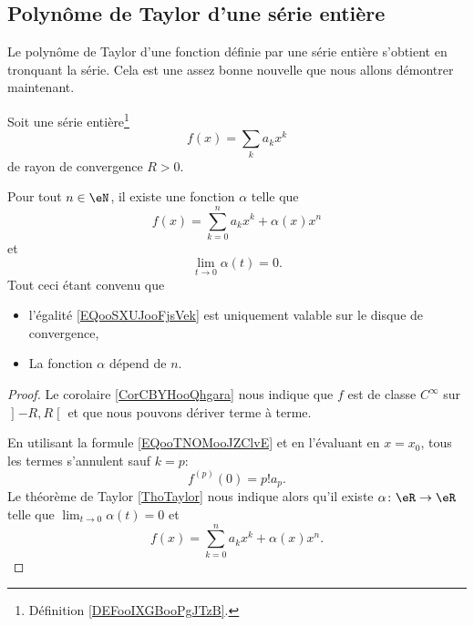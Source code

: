 \subsection{Polynôme de Taylor d'une série entière}

Le polynôme de Taylor d'une fonction définie par une série entière s'obtient en tronquant la série. Cela est une assez bonne nouvelle que nous allons démontrer maintenant.

\begin{proposition}      \label{PROPooQLHNooRsBYbe}
	Soit une série entière\footnote{Définition \ref{DEFooIXGBooPgJTzB}.}
	\begin{equation}
		f(x)=\sum_ka_kx^k
	\end{equation}
	de rayon de convergence \( R>0\).

	Pour tout \( n\in \eN\), il existe une fonction \( \alpha\) telle que
	\begin{equation}    \label{EQooSXUJooFjsVek}
		f(x)=\sum_{k=0}^na_kx^k+\alpha(x)x^n
	\end{equation}
	et
	\begin{equation}
		\lim_{t\to 0} \alpha(t)=0.
	\end{equation}
	Tout ceci étant convenu que
	\begin{itemize}
		\item
		      l'égalité \eqref{EQooSXUJooFjsVek} est uniquement valable sur le disque de convergence,
		\item La fonction \( \alpha\) dépend de \( n\).
	\end{itemize}
\end{proposition}

\begin{proof}
	Le corolaire \ref{CorCBYHooQhgara} nous indique que \( f\) est de classe \(  C^{\infty}\) sur \( \mathopen] -R , R \mathclose[\) et que nous pouvons dériver terme à terme.

	En utilisant la formule \eqref{EQooTNOMooJZClvE} et en l'évaluant en \( x=x_0\), tous les termes s'annulent sauf \( k=p\):
	\begin{equation}
		f^{(p)}(0)=p!a_p.
	\end{equation}
	Le théorème de Taylor \ref{ThoTaylor} nous indique alors qu'il existe \( \alpha\colon \eR\to \eR\) telle que \( \lim_{t\to 0} \alpha(t)=0\) et
	\begin{equation}
		f(x)=\sum_{k=0}^{n}a_kx^k+\alpha(x)x^n.
	\end{equation}
\end{proof}

